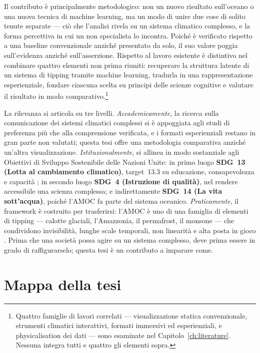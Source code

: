 Il contributo è principalmente metodologico: non un nuovo risultato sull'oceano o una nuova tecnica di machine learning, ma un modo di unire due cose di solito tenute separate --- ciò che l'analisi rivela su un sistema climatico complesso, e la forma percettiva in cui un non specialista lo incontra. Poiché è verificato rispetto a una baseline convenzionale anziché presentato da solo, il suo valore poggia sull'evidenza anziché sull'asserzione. Rispetto al lavoro esistente è distintivo nel combinare quattro elementi non prima riuniti: recuperare la struttura latente di un sistema di tipping tramite machine learning, tradurla in una rappresentazione esperienziale, fondare ciascuna scelta su principi delle scienze cognitive e valutare il risultato in modo comparativo.\footnote{Quattro famiglie di lavori correlati --- visualizzazione statica convenzionale, strumenti climatici interattivi, formati immersivi ed esperienziali, e physicalisation dei dati --- sono esaminate nel Capitolo~\ref{ch:literature}. Nessuna integra tutti e quattro gli elementi sopra.}

La rilevanza si articola su tre livelli. \emph{Accademicamente}, la ricerca sulla comunicazione dei sistemi climatici complessi si è appoggiata agli studi di preferenza più che alla comprensione verificata, e i formati esperienziali restano in gran parte non valutati; questa tesi offre una metodologia comparativa anziché un'altra visualizzazione. \emph{Istituzionalmente}, si allinea in modo sostanziale agli Obiettivi di Sviluppo Sostenibile delle Nazioni Unite: in primo luogo \textbf{SDG~13 (Lotta al cambiamento climatico)}, target~13.3 su educazione, consapevolezza e capacità \citep{un2015}; in secondo luogo \textbf{SDG~4 (Istruzione di qualità)}, nel rendere accessibile una scienza complessa; e indirettamente \textbf{SDG~14 (La vita sott'acqua)}, poiché l'AMOC fa parte del sistema oceanico. \emph{Praticamente}, il framework è costruito per trasferirsi: l'AMOC è uno di una famiglia di elementi di tipping --- calotte glaciali, l'Amazzonia, il permafrost, il monsone --- che condividono invisibilità, lunghe scale temporali, non linearità e alta posta in gioco \citep{armstrongmckay2022, lenton2008}. Prima che una società possa agire su un sistema complesso, deve prima essere in grado di raffigurarselo; questa tesi è un contributo a imparare come.



\section{Mappa della tesi}
\label{sec:roadmap}

